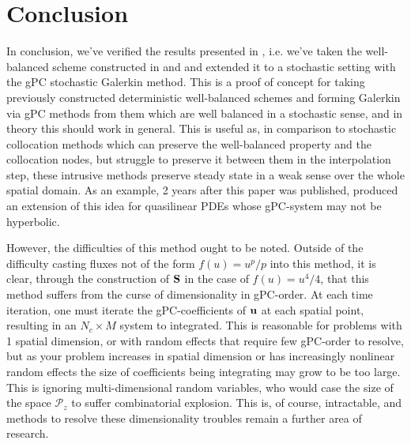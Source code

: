 \documentclass[12pt]{article}
\begin{document}
\clearpage
\section{Conclusion}
In conclusion, we've verified the results presented in \cite{Jin2015}, i.e. we've taken the well-balanced scheme constructed in \cite{Jin2001} and and extended it to a stochastic setting with the gPC stochastic Galerkin method. 
This is a proof of concept for taking previously constructed deterministic well-balanced schemes and forming Galerkin via gPC methods from them which are well balanced in a stochastic sense, and in theory this should work in general.
This is useful as, in comparison to stochastic collocation methods which can preserve the well-balanced property and the collocation nodes, but struggle to preserve it between them in the interpolation step, these intrusive methods preserve steady state in a weak sense over the whole spatial domain.
As an example, 2 years after this paper was published, \cite{Wu2017} produced an extension of this idea for quasilinear PDEs whose gPC-system may not be hyperbolic.

However, the difficulties of this method ought to be noted.
Outside of the difficulty casting fluxes not of the form $f(u) = u^p / p$ into this method, it is clear, through the construction of $\mathbf{{S}}$ in the case of $f(u) = u^4 / 4$, that this method suffers from the curse of dimensionality in gPC-order.
At each time iteration, one must iterate the gPC-coefficients of $\vb{u}$ at each spatial point, resulting in an $N_c \times M$ system to integrated.
This is reasonable for problems with 1 spatial dimension, or with random effects that require few gPC-order to resolve, but as your problem increases in spatial dimension or has increasingly nonlinear random effects the size of coefficients being integrating may grow to be too large.
This is ignoring multi-dimensional random variables, who would case the size of the space $\mathcal{P}_z$ to suffer combinatorial explosion.
This is, of course, intractable, and methods to resolve these dimensionality troubles remain a further area of research.

\printbibliography
\end{document}
